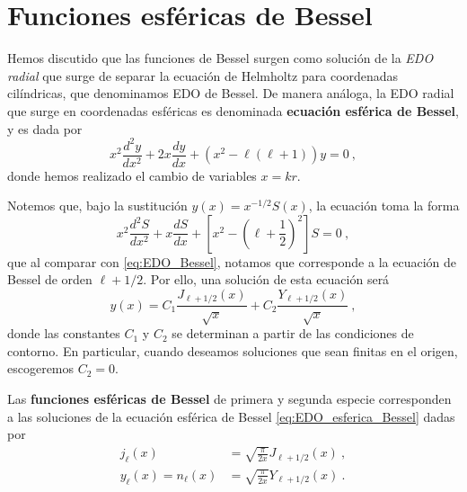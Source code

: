 \section{Funciones esféricas de Bessel}

Hemos discutido que las funciones de Bessel surgen como solución de la \emph{EDO radial} que surge de separar la ecuación de Helmholtz para coordenadas cilíndricas, que denominamos EDO de Bessel. De manera análoga, la EDO radial que surge en coordenadas esféricas es denominada \textbf{ecuación esférica de Bessel}, y es dada por
\begin{equation}
    x^2 \frac{d^2y}{dx^2} + 2x \frac{dy}{dx} + (x^2 - \ell(\ell+1))y = 0 \ ,
\end{equation}
donde hemos realizado el cambio de variables $x = kr$.

Notemos que, bajo la sustitución $y(x) = x^{-1/2} S(x)$, la ecuación toma la forma
\begin{equation} \label{eq:EDO_esferica_Bessel}
    x^2 \frac{d^2 S}{dx^2} + x \frac{dS}{dx} + \left[x^2 - \left(\ell + \frac{1}{2}\right)^2\right]S = 0 \ ,
\end{equation}
que al comparar con \eqref{eq:EDO_Bessel}, notamos que corresponde a la ecuación de Bessel de orden $\ell + 1/2$. Por ello, una solución de esta ecuación será
\begin{equation}
    y(x) = C_1 \frac{J_{\ell + 1/2}(x)}{\sqrt{x}} + C_2 \frac{Y_{\ell + 1/2}(x)}{\sqrt{x}} \ ,
\end{equation}
donde las constantes $C_1$ y $C_2$ se determinan a partir de las condiciones de contorno. En particular, cuando deseamos soluciones que sean finitas en el origen, escogeremos $C_2 = 0$.

\begin{defi} 
    Las \textbf{funciones esféricas de Bessel} de primera y segunda especie corresponden a las soluciones de la ecuación esférica de Bessel \eqref{eq:EDO_esferica_Bessel} dadas por
    \begin{align}
        j_\ell(x) & = \sqrt{\frac{\pi}{2x}} J_{\ell + 1/2}(x) \ , \\
        y_\ell(x) = n_\ell(x) & = \sqrt{\frac{\pi}{2x}} Y_{\ell + 1/2}(x) \ .
    \end{align}
\end{defi}

